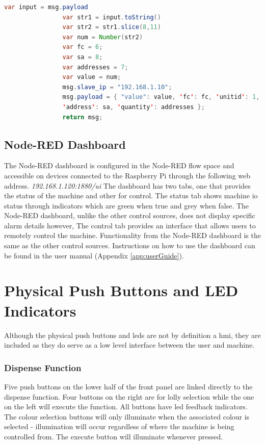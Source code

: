             \begin{lstlisting}[language=Java, caption=Watchdog timer script, label=list:watchDog]
                var input = msg.payload
                var str1 = input.toString()
                var str2 = str1.slice(8,11)
                var num = Number(str2)
                var fc = 6;
                var sa = 8;
                var addresses = 7;
                var value = num;
                msg.slave_ip = "192.168.1.10";
                msg.payload = { "value": value, 'fc': fc, 'unitid': 1, 
                'address': sa, 'quantity': addresses };
                return msg;
            \end{lstlisting}            

    \subsection{Node-RED Dashboard}
        The Node-RED dashboard is configured in the Node-RED flow space and accessible on devices connected to the Raspberry Pi through the following web address. \newline \textit{192.168.1.120:1880/ui} \newline The dashboard has two tabs, one that provides the status of the machine and other for control. The status tab shows machine \acrshort{io} status through indicators which are green when true and grey when false. The Node-RED dashboard, unlike the other control sources, does not display specific alarm details however, 
        The control tab provides an interface that allows users to remotely control the machine. Functionality from the Node-RED dashboard is the same as the other control sources. Instructions on how to use the dashboard can be found in the user manual (Appendix \ref{app:userGuide}).
        

\section{Physical Push Buttons and LED Indicators}
    Although the physical push buttons and \acrshort{led}s are not by definition a \acrshort{hmi}, they are included as they do serve as a low level interface between the user and machine.

    \subsubsection{Dispense Function}
        Five push buttons on the lower half of the front panel are linked directly to the dispense function. Four buttons on the right are for lolly selection while the one on the left will execute the function. All buttons have \acrshort{led} feedback indicators. The colour selection buttons will only illuminate when the associated colour is selected - illumination will occur regardless of where the machine is being controlled from. The execute button will illuminate whenever pressed.

